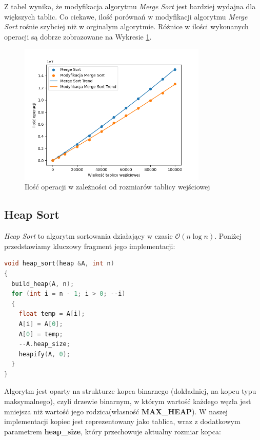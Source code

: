 \documentclass{article}
\newcommand{\bigO}{\mathcal{O}}
\begin{document}
Z tabel wynika, że modyfikacja algorytmu \textit{Merge Sort} jest bardziej wydajna dla większych tablic. Co ciekawe, ilość porównań w modyfikacji algorytmu \textit{Merge Sort} rośnie szybciej niż w orginalym algorytmie. Różnice w ilości wykonanych operacji są dobrze zobrazowane na Wykresie \ref{fig:merge}.

\begin{figure}[H]
    \centering
    \includegraphics[width=0.8\textwidth]{Figure_2.png}
    \caption{Ilość operacji w zależności od rozmiarów tablicy wejściowej}
    \label{fig:merge}
\end{figure}
\subsection{Heap Sort}
\textit{Heap Sort} to algorytm sortowania działający w czasie $\bigO (n \log n)$. Poniżej przedstawiamy kluczowy fragment jego implementacji:
\begin{lstlisting}[style=mystyle, language=C++, caption={Implementacja \texttt{Heap Sort}}, label={lst:heapsort}]
void heap_sort(heap &A, int n)
{
  build_heap(A, n);
  for (int i = n - 1; i > 0; --i)
  {
    float temp = A[i];
    A[i] = A[0];
    A[0] = temp;
    --A.heap_size;
    heapify(A, 0);
  }
}
\end{lstlisting}
Algorytm jest oparty na strukturze kopca binarnego (dokładniej, na kopcu typu maksymalnego), czyli drzewie binarnym, w którym wartość każdego węzła jest mniejsza niż wartość jego rodzica(własność \textbf{MAX\_HEAP}). W naszej implementacji kopiec jest reprezentowany jako tablica, wraz z dodatkowym parametrem \textbf{heap\_size}, który przechowuje aktualny rozmiar kopca:

\newpage
\end{document}
